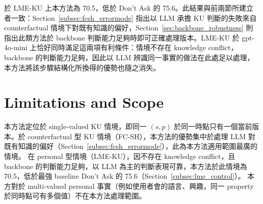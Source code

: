 於 LME-KU 上本方法為 70.5，低於 Don't Ask 的 75.6。此結果與前兩節所建立者一致：Section~\ref{subsec:fcsh_errormode} 指出以 LLM 承擔 KU 判斷的失敗來自 counterfactual 情境下對既有知識的偏好，Section~\ref{sec:backbone_robustness} 則指出此類方法於 backbone 判斷能力足夠時即可正確處理版本。LME-KU 於 gpt-4o-mini 上恰好同時滿足這兩項有利條件：情境不存在 knowledge conflict，backbone 的判斷能力足夠，因此以 LLM 辨識同一事實的做法在此處足以處理，本方法將該步驟結構化所換得的優勢也隨之消失。

\section{Limitations and Scope}
\label{sec:limitations}
 
本方法定位於 single-valued KU 情境，即同一 $(s, p)$ 於同一時點只有一個當前版本。於 counterfactual 型 KU 情境（FC-SH），本方法的優勢集中於處理 LLM 對既有知識的偏好（Section~\ref{subsec:fcsh_errormode}），此為本方法適用範圍最廣的情境。
在 personal 型情境（LME-KU），因不存在 knowledge conflict，且 backbone 的判斷能力足夠，以 LLM 為主的判斷表現可靠，本方法於此情境為 70.5，低於最強 baseline Don't Ask 的 75.6（Section~\ref{subsec:lme_control}）。
本方對於 multi-valued personal 事實（例如使用者會的語言、興趣，同一 property 於同時點可有多個值）不在本方法處理範圍。